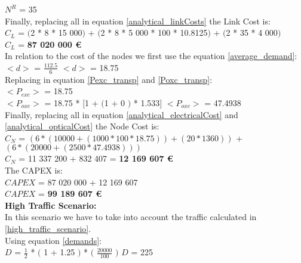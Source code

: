 $N^R$ = 35\\

Finally, replacing all in equation \ref{analytical_linkCosts} the Link Cost is:\\

$C_L$ = $($2 * 8 * 15 000$)$ + $($2 * 8 * 5 000 * 100 * 10.8125$)$ + $($2 * 35 * 4 000$)$\\

$C_L$ = \textbf{87 020 000 \euro}\\

In relation to the cost of the nodes we first use the equation \ref{average_demand}:\\

$<d>$ = $\frac{112.5}{6}$ \qquad \qquad $<d>$ = 18.75\\

Replacing in equation \ref{Pexc_transp} and \ref{Poxc_transp}:\\

$<P_{exc}>$ = 18.75\\

$<P_{oxc}>$ = 18.75 * $[$1 + $($1 + $0$ $)$ * 1.533$]$ \qquad \quad $<P_{oxc}>$ = 47.4938 \\

Finally, replacing all in equation \ref{analytical_electricalCost} and \ref{analytical_opticalCost} the Node Cost is:\\

$C_N$ = $\left(6 * (10 000 + (1 000 * 100 * 18.75)) + (20 * 1 360)\right)$ + $\left(6 * (20 000 + (2 500 * 47.4938)) \right)$\\

$C_N$ = 11 337 200 + 832 407 = \textbf{12 169 607 \euro}\\

The CAPEX is:\\
$CAPEX$ = 87 020 000 + 12 169 607 \\

$CAPEX$ = \textbf{99 189 607 \euro} \\


\textbf{High Traffic Scenario:}\\
In this scenario we have to take into account the traffic calculated in \ref{high_traffic_scenario}.\\

Using equation \ref{demands}:\\

$D$ = $\frac{1}{2}$ * $($ 1 + 1.25 $)$ * $($ $\frac{20000}{100}$ $)$ \qquad \qquad $D$ = 225\\


